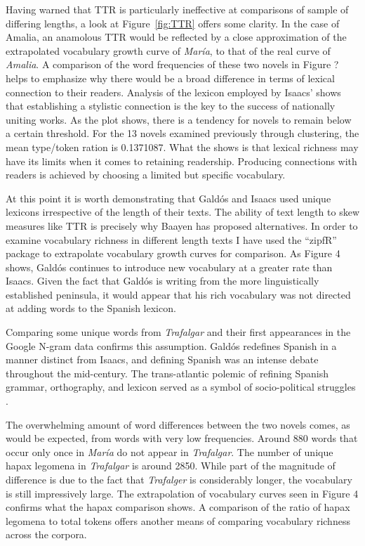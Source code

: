 \documentclass[12pt]{report}
\begin{document}
Having warned that TTR is particularly ineffective at comparisons of sample of differing lengths, a look at Figure~\ref{fig:TTR} offers some clarity.
In the case of Amalia, an anamolous TTR would be reflected by a close approximation of the extrapolated vocabulary growth curve of \textit{María}, to that of the real curve of \textit{Amalia}.
A comparison of the word frequencies of these two novels in Figure ? helps to emphasize why there would be a broad difference in terms of lexical connection to their readers.
Analysis of the lexicon employed by Isaacs' shows that establishing a stylistic connection is the key to the success of nationally uniting works. 
As the plot shows, there is a tendency for novels to remain below a certain threshold.
For the 13 novels examined previously through clustering, the mean type/token ration is 0.1371087.
What the shows is that lexical richness may have its limits when it comes to retaining readership. 
Producing connections with readers is achieved by choosing a limited but specific vocabulary.


At this point it is worth demonstrating that Galdós and Isaacs used unique lexicons irrespective of the length of their texts.
The ability of text length to skew measures like TTR is precisely why Baayen has proposed alternatives.
In order to examine vocabulary richness in different length texts I have used the \enquote{zipfR} package to extrapolate vocabulary growth curves for comparison.
As Figure 4 shows, Galdós continues to introduce new vocabulary at a greater rate than Isaacs.
Given the fact that Galdós is writing from the more linguistically established peninsula, it would appear that his rich vocabulary was not directed at adding words to the Spanish lexicon. 

Comparing some unique words from \textit{Trafalgar} and their first appearances in the Google N-gram data confirms this assumption.
Galdós redefines Spanish in a manner distinct from Isaacs, and defining Spanish was an intense debate throughout the mid-century.
The trans-atlantic polemic of refining Spanish grammar, orthography, and lexicon served as a symbol of socio-political struggles \cite[230]{Villa2015}.

The overwhelming amount of word differences between the two novels comes, as would be expected, from words with very low frequencies.
Around 880 words that occur only once in \textit{María} do not appear in \textit{Trafalgar}.
The number of unique hapax legomena in \textit{Trafalgar} is around 2850.
While part of the magnitude of difference is due to the fact that \textit{Trafalger} is considerably longer, the vocabulary is still impressively large.
The extrapolation of vocabulary curves seen in Figure 4 confirms what the hapax comparison shows.
A comparison of the ratio of hapax legomena to total tokens offers another means of comparing vocabulary richness across the corpora.
\end{document}
